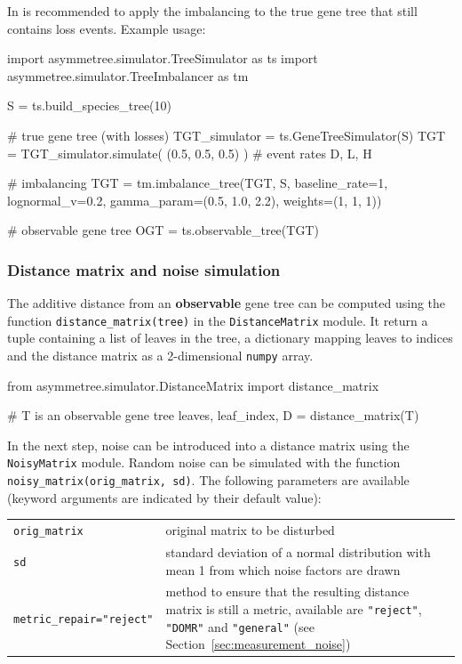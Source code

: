 \documentclass[hidelinks,11pt]{scrreprt}
\begin{document}
In is recommended to apply the imbalancing to the true gene tree that still contains loss events.
Example usage:
\vspace{2mm}
\begin{python}
import asymmetree.simulator.TreeSimulator as ts
import asymmetree.simulator.TreeImbalancer as tm

S = ts.build_species_tree(10)

# true gene tree (with losses)
TGT_simulator = ts.GeneTreeSimulator(S)
TGT = TGT_simulator.simulate( (0.5, 0.5, 0.5) )    # event rates D, L, H

# imbalancing
TGT = tm.imbalance_tree(TGT, S, baseline_rate=1,
                        lognormal_v=0.2,
                        gamma_param=(0.5, 1.0, 2.2),
                        weights=(1, 1, 1))

# observable gene tree
OGT = ts.observable_tree(TGT)
\end{python}
\vspace{2mm}


\subsubsection{Distance matrix and noise simulation}

The additive distance from an \textbf{observable} gene tree can be computed using the function \texttt{distance\_matrix(tree)} in the \texttt{DistanceMatrix} module.
It return a tuple containing a list of leaves in the tree, a dictionary mapping leaves to indices and the distance matrix as a 2-dimensional \texttt{numpy} array.

\vspace{2mm}
\begin{python}
from asymmetree.simulator.DistanceMatrix import distance_matrix

# T is an observable gene tree
leaves, leaf_index, D = distance_matrix(T)
\end{python}
\vspace{2mm}

In the next step, noise can be introduced into a distance matrix using the \texttt{NoisyMatrix} module.
Random noise can be simulated with the function \texttt{noisy\_matrix(orig\_matrix, sd)}.
The following parameters are available (keyword arguments are indicated by their default value):

\vspace{3mm}
\renewcommand{\arraystretch}{1.5}
\begin{tabularx}{0.95\textwidth} { >{\raggedright\arraybackslash}p{4.5cm} >{\raggedright\arraybackslash}X }
	\texttt{orig\_matrix} & original matrix to be disturbed\\
	\texttt{sd}  & standard deviation of a normal distribution with mean 1 from which noise factors are drawn\\
	\texttt{metric\_repair="reject"}  & method to ensure that the resulting distance matrix is still a metric, available are \texttt{"reject"}, \texttt{"DOMR"} and \texttt{"general"} (see Section~\ref{sec:measurement_noise})\\
\end{tabularx}
\vspace{3mm}
\end{document}
